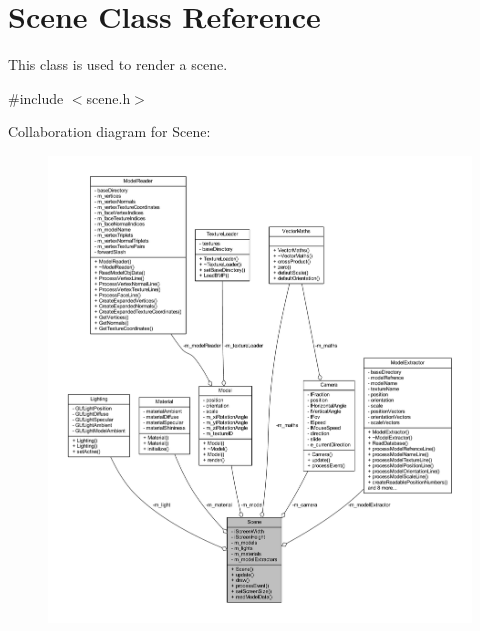 \hypertarget{class_scene}{}\section{Scene Class Reference}
\label{class_scene}


This class is used to render a scene.  




{\ttfamily \#include $<$scene.\+h$>$}



Collaboration diagram for Scene\+:
\nopagebreak
\begin{figure}[H]
\begin{center}
\leavevmode
\includegraphics[width=350pt]{class_scene__coll__graph}
\end{center}
\end{figure}
